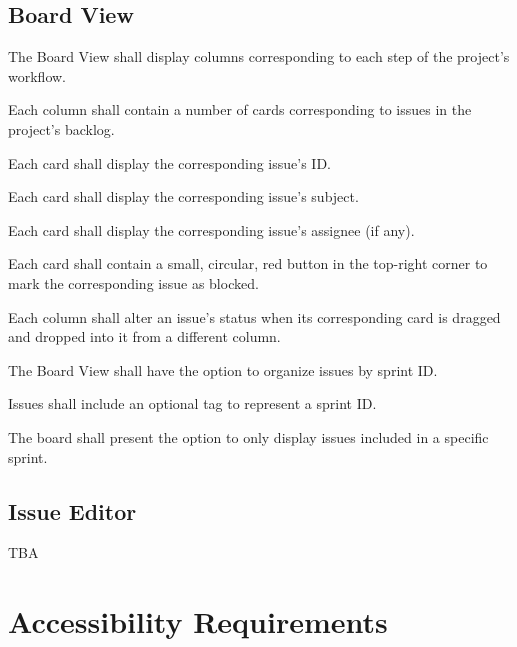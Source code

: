 \documentclass[12pt]{report}
\begin{document}
	\subsection{Board View}
		\begin{reqlist}
			\item The Board View shall display columns corresponding to each step of the project's workflow.
			\begin{reqlist}
				\item Each column shall contain a number of cards corresponding to issues in the project's backlog.
				\begin{reqlist}
					\item Each card shall display the corresponding issue's ID.
					\item Each card shall display the corresponding issue's subject.
					\item Each card shall display the corresponding issue's assignee (if any).
					\item Each card shall contain a small, circular, red button in the top-right corner to mark the corresponding issue as blocked.
				\end{reqlist}
				\item Each column shall alter an issue's status when its corresponding card is dragged and dropped into it from a different column.
			\end{reqlist}
			\item The Board View shall have the option to organize issues by sprint ID.
			\begin{reqlist}
				\item Issues shall include an optional tag to represent a sprint ID.
				\item The board shall present the option to only display issues included in a specific sprint.
			\end{reqlist}
		\end{reqlist}
	\subsection{Issue Editor}
		TBA
\section{Accessibility Requirements}
\end{document}
